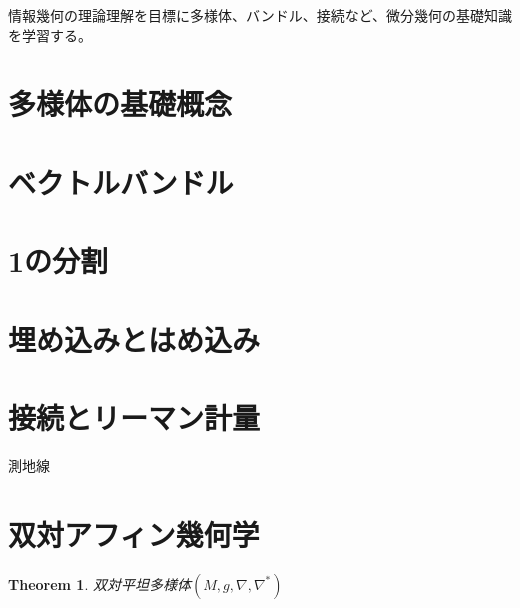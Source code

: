 \documentclass{ujarticle}
\newtheorem{thm}{Theorem}[section]
\begin{document}
情報幾何の理論理解を目標に多様体、バンドル、接続など、微分幾何の基礎知識を学習する。

\section{多様体の基礎概念}
\label{sec:多様体の基礎概念}

\section{ベクトルバンドル}
\label{sec:ベクトルバンドル}

\section{1の分割}
\label{sec:1の分割}

\section{埋め込みとはめ込み}
\label{sec:埋め込みとはめ込み}


\section{接続とリーマン計量}
\label{sec:接続とリーマン計量}

測地線

\section{双対アフィン幾何学}
\label{sec:双対アフィン幾何学}

\begin{thm}
 双対平坦多様体$(M,g,\nabla,\nabla^{*} )$
\end{thm}
\end{document}

